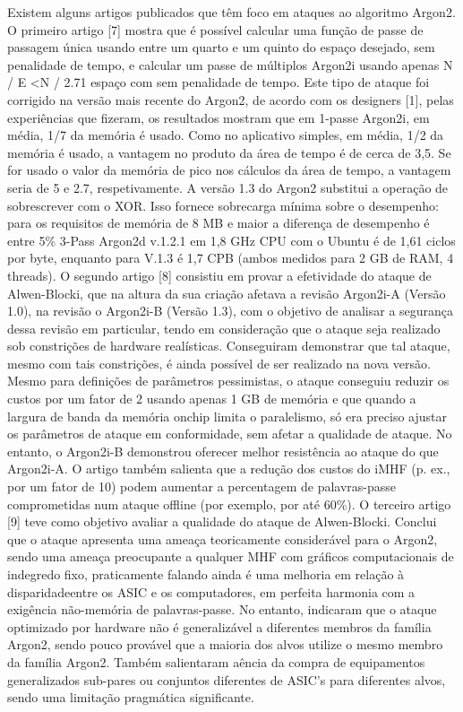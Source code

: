 \documentclass[conference]{IEEEtran}
\begin{document}
Existem alguns artigos publicados que têm foco em ataques ao algoritmo Argon2. 
O primeiro artigo [7] mostra que é possível calcular uma função de passe de passagem única usando entre um quarto e 
um quinto do espaço desejado, sem penalidade de tempo, e calcular um passe de múltiplos Argon2i usando 
apenas N / E <N / 2.71 espaço com sem penalidade de tempo. Este tipo de ataque foi corrigido na versão mais recente do Argon2, 
de acordo com os designers [1], pelas experiências que fizeram, os resultados mostram que em 1-passe Argon2i, em média, 
1/7 da memória é usado. Como no aplicativo simples, em média, 1/2 da memória é usado, 
a vantagem no produto da área de tempo é de cerca de 3,5. Se for usado o valor da memória de pico nos cálculos da área de tempo, 
a vantagem seria de 5 e 2.7, respetivamente. A versão 1.3 do Argon2 substitui a operação de sobrescrever com o XOR. 
Isso fornece sobrecarga mínima sobre o desempenho: para os requisitos de memória de 8 MB e maior a 
diferença de desempenho é entre 5\% 3-Pass Argon2d v.1.2.1 em 1,8 GHz CPU com o Ubuntu é de 1,61 ciclos por byte, 
enquanto para V.1.3 é 1,7 CPB (ambos medidos para 2 GB de RAM, 4 threads).
O segundo artigo [8] consistiu em provar a efetividade do ataque de Alwen-Blocki, 
que na altura da sua criação afetava a revisão Argon2i-A (Versão 1.0), na revisão o Argon2i-B (Versão 1.3), 
com o objetivo de analisar a segurança dessa revisão em particular, 
tendo em consideração que o ataque seja realizado sob constrições de hardware realísticas. 
Conseguiram demonstrar que tal ataque, mesmo com tais constrições, é ainda possível de ser realizado na nova versão. 
Mesmo para definições de parâmetros pessimistas, o ataque conseguiu reduzir os custos por um fator de 2 usando apenas 
1 GB de memória e que quando a largura de banda da memória onchip limita o paralelismo, 
só era preciso ajustar os parâmetros de ataque em conformidade, sem afetar a qualidade de ataque. No entanto, 
o Argon2i-B demonstrou oferecer melhor resistência ao ataque do que Argon2i-A. 
O artigo também salienta que a redução dos custos do iMHF (p. ex., por um fator de 10) podem aumentar a 
percentagem de palavras-passe comprometidas num ataque offline (por exemplo, por até 60\%). 
O terceiro artigo [9] teve como objetivo avaliar a qualidade do ataque de Alwen-Blocki. 
Conclui que o ataque apresenta uma ameaça teoricamente considerável para o Argon2, 
sendo uma ameaça preocupante a qualquer MHF com gráficos computacionais de indegredo fixo, 
praticamente falando ainda é uma melhoria em relação à disparidadeentre os ASIC e os computadores, 
em perfeita harmonia com a exigência não-memória de palavras-passe. No entanto, 
indicaram que o ataque optimizado por hardware não é generalizável a diferentes membros da família Argon2, 
sendo pouco provável que a maioria dos alvos utilize o mesmo membro da família Argon2. 
Também salientaram aência da compra de equipamentos generalizados sub-pares ou conjuntos diferentes de ASIC's para diferentes alvos, 
sendo uma limitação pragmática significante.
\end{document}
